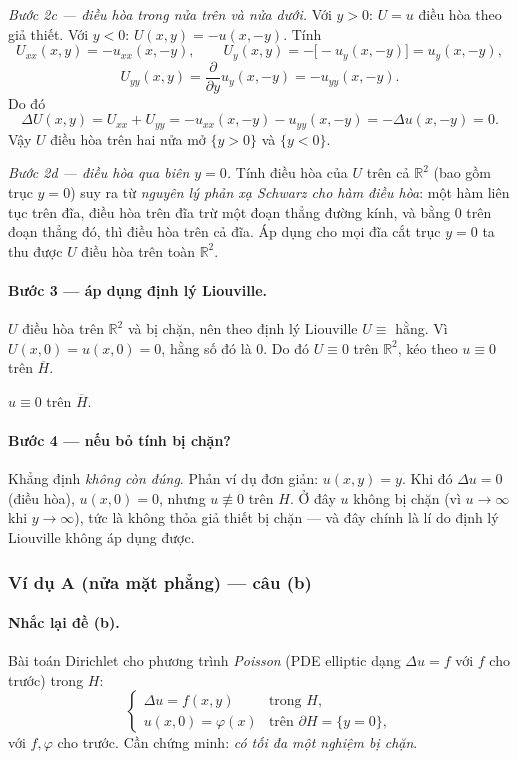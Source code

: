 \emph{Bước 2c --- điều hòa trong nửa trên và nửa dưới.} Với $y>0$: $U=u$ điều hòa theo giả thiết. Với $y<0$: $U(x,y)=-u(x,-y)$. Tính
\[
U_{xx}(x,y)=-u_{xx}(x,-y),\qquad U_y(x,y)=-\big[-u_y(x,-y)\big]=u_y(x,-y),
\]
\[
U_{yy}(x,y)=\frac{\partial}{\partial y}u_y(x,-y)=-u_{yy}(x,-y).
\]
Do đó
\[
\Delta U(x,y)=U_{xx}+U_{yy}=-u_{xx}(x,-y)-u_{yy}(x,-y)=-\Delta u(x,-y)=0.
\]
Vậy $U$ điều hòa trên hai nửa mở $\{y>0\}$ và $\{y<0\}$.

\emph{Bước 2d --- điều hòa qua biên $y=0$.} Tính điều hòa của $U$ trên cả $\mathbb{R}^2$ (bao gồm trục $y=0$) suy ra từ \emph{nguyên lý phản xạ Schwarz cho hàm điều hòa}: một hàm liên tục trên đĩa, điều hòa trên đĩa trừ một đoạn thẳng đường kính, và bằng $0$ trên đoạn thẳng đó, thì điều hòa trên cả đĩa. Áp dụng cho mọi đĩa cắt trục $y=0$ ta thu được $U$ điều hòa trên toàn $\mathbb{R}^2$.

\paragraph{Bước 3 --- áp dụng định lý Liouville.}
$U$ điều hòa trên $\mathbb{R}^2$ và bị chặn, nên theo định lý Liouville $U\equiv$ hằng. Vì $U(x,0)=u(x,0)=0$, hằng số đó là $0$. Do đó $U\equiv 0$ trên $\mathbb{R}^2$, kéo theo $u\equiv 0$ trên $\overline H$.

\begin{nhobox}
$u\equiv 0$ trên $\overline{H}$.
\end{nhobox}

\paragraph{Bước 4 --- nếu bỏ tính bị chặn?}
Khẳng định \emph{không còn đúng}. Phản ví dụ đơn giản: $u(x,y)=y$. Khi đó $\Delta u=0$ (điều hòa), $u(x,0)=0$, nhưng $u\not\equiv0$ trên $H$. Ở đây $u$ không bị chặn (vì $u\to\infty$ khi $y\to\infty$), tức là không thỏa giả thiết bị chặn --- và đây chính là lí do định lý Liouville không áp dụng được.

\subsubsection*{Ví dụ A (nửa mặt phẳng) --- câu (b)}

\paragraph{Nhắc lại đề (b).} Bài toán Dirichlet cho phương trình \emph{Poisson} (PDE elliptic dạng $\Delta u=f$ với $f$ cho trước) trong $H$:
\[
\begin{cases}
\Delta u = f(x,y) & \text{trong } H,\\
u(x,0)=\varphi(x) & \text{trên } \partial H=\{y=0\},
\end{cases}
\]
với $f,\varphi$ cho trước. Cần chứng minh: \emph{có tối đa một nghiệm bị chặn}.

